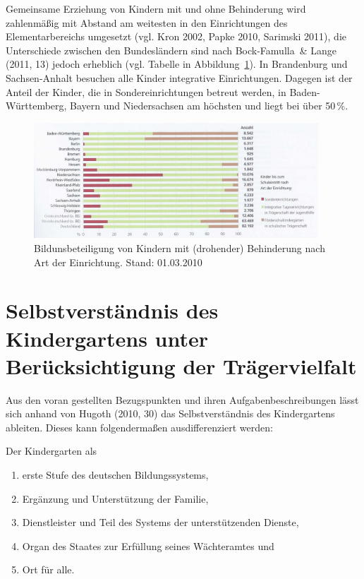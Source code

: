Gemeinsame Erziehung von Kindern mit und ohne Behinderung wird zahlenmäßig mit Abstand am weitesten in den Einrichtungen des Elementarbereichs umgesetzt (vgl. Kron 2002, Papke 2010, Sarimski 2011), die Unterschiede zwischen den Bundesländern sind nach Bock-Famulla~\& Lange (2011, 13) jedoch erheblich (vgl. Tabelle in Abbildung~\ref{bild:bildungsbeteiligung}). In Brandenburg und Sachsen-Anhalt besuchen alle Kinder integrative Einrichtungen. Dagegen ist der Anteil der Kinder, die in Sondereinrichtungen betreut werden, in Baden-Württemberg, Bayern und Niedersachsen am höchsten und liegt bei über 50\,\%. 
\begin{figure}
  \centering
  \includegraphics[width=0.95\textwidth]{bilder/bildungsbeteiligung}
  \caption{Bildunsbeteiligung von Kindern mit (drohender) Behinderung nach Art der Einrichtung. Stand: 01.03.2010}
  \label{bild:bildungsbeteiligung}
\end{figure}


\section{Selbstverständnis des Kindergartens unter Berücksichtigung der Trägervielfalt}\label{sec:kitaSelbst}
Aus den voran gestellten Bezugspunkten und ihren Aufgabenbeschreibungen lässt sich anhand von Hugoth (2010, 30) das Selbstverständnis des Kindergartens ableiten. Dieses kann folgendermaßen ausdifferenziert werden:

Der Kindergarten als
\begin{enumerate}
\item erste Stufe des deutschen Bildungssystems,
\item Ergänzung und Unterstützung der Familie,
\item Dienstleister und Teil des Systems der unterstützenden Dienste,
\item Organ des Staates zur Erfüllung seines Wächteramtes und 
\item Ort für alle.
\end{enumerate}

